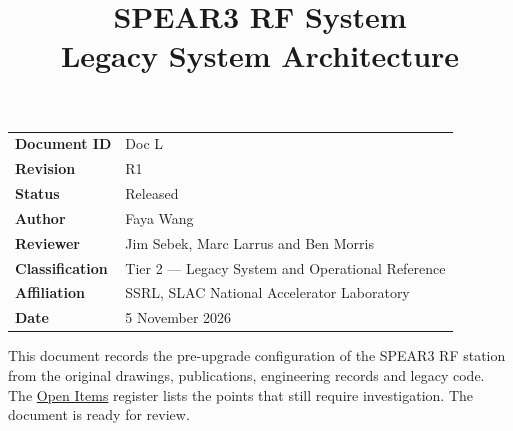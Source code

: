 \documentclass[letterpaper,11pt]{article}
\title{\vspace{-1.4cm}\bfseries SPEAR3 RF System\\[2mm]
       \Large Legacy System Architecture}
\author{}
\date{}
\begin{document}
\maketitle
\thispagestyle{plain}

\begin{center}
\begin{minipage}{0.86\linewidth}\small
\begin{tabular}{@{}ll@{}}
\textbf{Document ID} & Doc L \\
\textbf{Revision}    & R1 \\
\textbf{Status}        & Released \\
\textbf{Author}        & Faya Wang \\
\textbf{Reviewer}        & Jim Sebek, Marc Larrus and Ben Morris \\
\textbf{Classification}        & Tier 2 --- Legacy System and Operational Reference \\
\textbf{Affiliation}        & SSRL, SLAC National Accelerator Laboratory \\
\textbf{Date}        & 5 November 2026 \\
\end{tabular}
\end{minipage}
\end{center}

\vspace{4mm}
\begin{keynote}
This document records the pre-upgrade configuration of the
SPEAR3 RF station from the original drawings, publications, engineering records and
legacy code. The \hyperref[sec:open-items]{Open Items} register lists the points that still
require investigation. The document is ready for review.
\end{keynote}

\clearpage
\tableofcontents
\clearpage
\listoffigures
\clearpage


\end{document}
